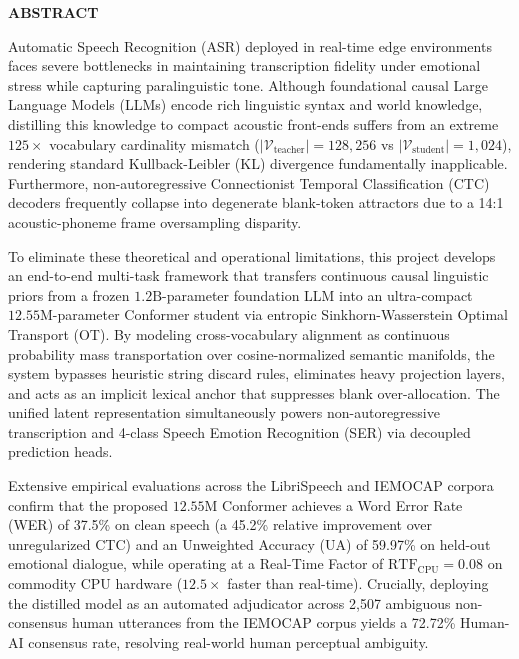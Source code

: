 \documentclass[12pt,a4paper]{report}
\begin{document}
\newpage
{}
\setcounter{page}{3}
\begin{center}
    {\Large \bfseries ABSTRACT \par}
\end{center}
\vspace{0.5cm}

Automatic Speech Recognition (ASR) deployed in real-time edge environments faces severe bottlenecks in maintaining transcription fidelity under emotional stress while capturing paralinguistic tone. Although foundational causal Large Language Models (LLMs) encode rich linguistic syntax and world knowledge, distilling this knowledge to compact acoustic front-ends suffers from an extreme $125\times$ vocabulary cardinality mismatch ($|\mathcal{V}_{\text{teacher}}| = 128{,}256$ vs $|\mathcal{V}_{\text{student}}| = 1{,}024$), rendering standard Kullback-Leibler (KL) divergence fundamentally inapplicable. Furthermore, non-autoregressive Connectionist Temporal Classification (CTC) decoders frequently collapse into degenerate blank-token attractors due to a 14:1 acoustic-phoneme frame oversampling disparity.

To eliminate these theoretical and operational limitations, this project develops an end-to-end multi-task framework that transfers continuous causal linguistic priors from a frozen $1.2\text{B}$-parameter foundation LLM into an ultra-compact $12.55\text{M}$-parameter Conformer student via entropic Sinkhorn-Wasserstein Optimal Transport (OT). By modeling cross-vocabulary alignment as continuous probability mass transportation over cosine-normalized semantic manifolds, the system bypasses heuristic string discard rules, eliminates heavy projection layers, and acts as an implicit lexical anchor that suppresses blank over-allocation. The unified latent representation simultaneously powers non-autoregressive transcription and 4-class Speech Emotion Recognition (SER) via decoupled prediction heads.

Extensive empirical evaluations across the LibriSpeech and IEMOCAP corpora confirm that the proposed $12.55\text{M}$ Conformer achieves a Word Error Rate (WER) of 37.5\% on clean speech (a 45.2\% relative improvement over unregularized CTC) and an Unweighted Accuracy (UA) of 59.97\% on held-out emotional dialogue, while operating at a Real-Time Factor of $\text{RTF}_{\text{CPU}} = 0.08$ on commodity CPU hardware ($12.5\times$ faster than real-time). Crucially, deploying the distilled model as an automated adjudicator across 2,507 ambiguous non-consensus human utterances from the IEMOCAP corpus yields a 72.72\% Human-AI consensus rate, resolving real-world human perceptual ambiguity.
\end{document}
